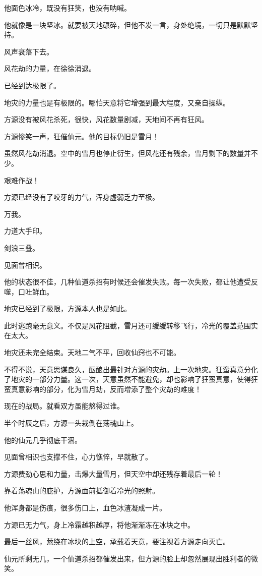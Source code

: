 \begin{this_body}
他面色冰冷，既没有狂笑，也没有呐喊。

他就像是一块坚冰。就要被天地碾碎，但他不发一言，身处绝境，一切只是默默坚持。

风声衰落下去。

风花劫的力量，在徐徐消退。

已经到达极限了。

地灾的力量也是有极限的。哪怕天意将它增强到最大程度，又亲自操纵。

方源没有被风花杀死，很快，风花数量剧减，天地间不再有狂风。

方源惨笑一声，狂催仙元。他的目标仍旧是雪月！

虽然风花劫消退。空中的雪月也停止衍生，但风花还有残余，雪月剩下的数量并不少。

艰难作战！

方源已经没有了咬牙的力气，浑身虚弱乏力至极。

万我。

力道大手印。

剑浪三叠。

见面曾相识。

他的状态很不佳，几种仙道杀招有时候还会催发失败。每一次失败，都让他遭受反噬，口吐鲜血。

地灾已经到了极限，方源本人也是如此。

此时逃跑毫无意义。不仅是风花阻截，雪月还可缓缓转移飞行，冷光的覆盖范围实在太大。

地灾还未完全结束。天地二气不平，回收仙窍也不可能。

不得不说，天意思谋良久，酝酿出最针对方源的灾劫。上一次地灾。狂蛮真意分化了地灾的一部分力量。这一次，天意虽然不能避免，却也影响了狂蛮真意，使得狂蛮真意影响的部分，化为雪月劫，反而增添了整个灾劫的难度！

现在的战局。就看双方虽能熬得过谁。

半个时辰之后，方源一头栽倒在荡魂山上。

他的仙元几乎彻底干涸。

见面曾相识也支撑不住，心力憔悴，早就散了。

方源费劲心思和力量，击爆大量雪月，但天空中却还残存着最后一轮！

靠着荡魂山的庇护，方源面前抵御着冷光的照射。

他浑身都是伤痕，很多伤口上，血色冰渣凝成一片。

方源已无力气，身上冷霜越积越厚，将他渐渐冻在冰块之中。

最后一丝风，萦绕在冰块的上空，承载着天意，要注视着方源走向灭亡。

仙元所剩无几，一个仙道杀招都催发出来，但方源的脸上却忽然展现出胜利者的微笑。


\end{this_body}
